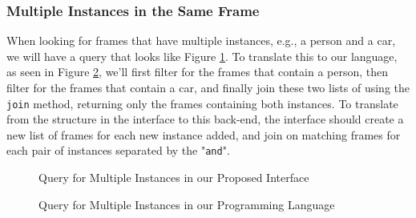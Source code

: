 \subsubsection{Multiple Instances in the Same Frame}
When looking for frames that have multiple instances, e.g., a person and a car, we will have a query that looks like Figure \ref{fig:Multiple1}. 
To translate this to our language, as seen in Figure \ref{fig:Multiple2}, we'll first filter for the frames that contain a person, then filter for the frames that contain a car, and finally join these two lists of  using the \texttt{join} method, returning only the frames containing both instances. 
To translate from the structure in the interface to this back-end, the interface should create a new list of frames for each new instance added, and join on matching frames for each pair of instances separated by the "\texttt{and}".

\begin{figure}[H]
    \caption{Query for Multiple Instances in our Proposed Interface}
    \label{fig:Multiple1}
\end{figure}

\begin{figure}[H]
    \caption{Query for Multiple Instances in our Programming Language}
    \label{fig:Multiple2}
\end{figure}

